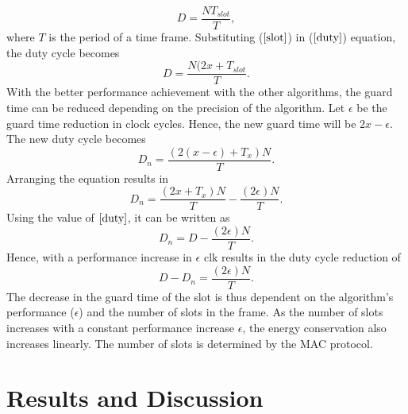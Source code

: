 \documentclass[a4paper,10pt]{report}
\begin{document}
\begin{equation}
D = \frac{NT_{slot}}{T}, \label{duty}
\end{equation}
where $T$ is the period of a time frame. \newline Substituting ($\ref{slot}$) in ($\ref{duty}$) equation, the duty cycle becomes
\begin{equation}
D= \frac{N(2x+T_{slot}}{T}.
\end{equation}
With the better performance achievement with the other algorithms, the guard time can be reduced depending on the precision of the
algorithm. Let $\epsilon$ be the guard time reduction in clock cycles. Hence, the new guard time will be $2x-\epsilon$.
\newline The new duty cycle becomes 
\begin{equation}
D_n=\frac{(2(x-\epsilon)+T_x)N}{T}.
\end{equation}
Arranging the equation results in
\begin{equation}
D_n= \frac{(2x+T_x)N}{T} - \frac{(2\epsilon)N}{T}.
\end{equation}
Using the value of $\ref{duty}$, it can be written as
\begin{equation}
D_n= D - \frac{(2\epsilon)N}{T}.
\end{equation}
Hence, with a performance increase in $\epsilon$ clk results in the duty cycle reduction of
\begin{equation}
D - D_n = \frac{(2\epsilon)N}{T}.
\end{equation}
The decrease in the guard time of the slot is thus dependent on the algorithm's performance ($\epsilon$) and the number of slots in the
frame. As the number of slots increases with a constant performance increase $\epsilon$, the energy conservation also increases linearly. The number of slots is determined by the MAC protocol.
\chapter{\textbf{Results and Discussion}}
\end{document}
